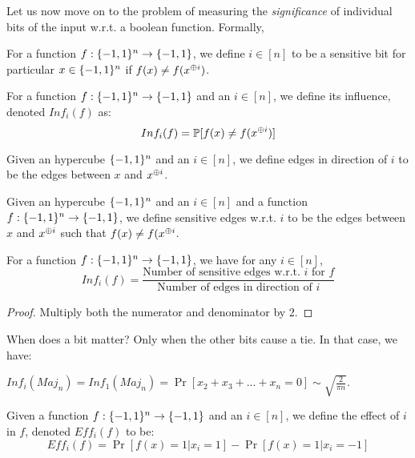 Let us now move on to the problem of measuring the \emph{significance} of individual bits of the input w.r.t. a boolean function. Formally,

\begin{definition}
    For a function ${f} : {\{-1,1\}^n} \rightarrow {\{-1,1\}}$, we define $i \in [n]$ to be a sensitive bit for particular $x \in \{-1,1\}^n$ if $f(x) \neq f(x^{\oplus i})$.
\end{definition}

\begin{definition}[Influence]
    For a function ${f} : {\{-1,1\}^n} \rightarrow {\{-1,1\}}$ and an $i \in [n]$, we define its influence, denoted $Inf_i(f)$ as:
    \[Inf_i(f) = \mathbb{P}[f(x) \neq f(x^{\oplus i})]\]
\end{definition}

\begin{definition}
    Given an hypercube $\{-1,1\}^n$ and an $i \in [n]$, we define edges in direction of $i$ to be the edges between $x$ and $x^{\oplus i}$.
\end{definition}

\begin{definition}
    Given an hypercube $\{-1,1\}^n$ and an $i \in [n]$ and a function ${f} : {\{-1,1\}^n} \rightarrow {\{-1,1\}}$, we define sensitive edges w.r.t. $i$ to be the edges between $x$ and $x^{\oplus i}$ such that $f(x) \neq f(x^{\oplus i}$.
\end{definition}

\begin{lemma}
    For a function ${f} : {\{-1,1\}^n} \rightarrow {\{-1,1\}}$, we have for any $i \in [n]$,
    \[Inf_i(f) = \frac{\text{Number of sensitive edges w.r.t. $i$ for $f$}}{\text{Number of edges in direction of $i$}}\]

    \begin{proof}
        Multiply both the numerator and denominator by 2.
    \end{proof}
\end{lemma}

\begin{question}

    When does a bit matter? Only when the other bits cause a tie. In that case, we have:
    
    $Inf_i(Maj_n) = Inf_1(Maj_n) = \Pr[x_2+x_3+...+x_n = 0] \sim \sqrt{\frac{2}{\pi n}}$.
\end{question}

\begin{definition}[Effect of $i$ in $f$]
    Given a function ${f} : {\{-1,1\}^n} \rightarrow {\{-1,1\}}$ and an $i \in [n]$, we define the effect of $i$ in $f$, denoted $Eff_i(f)$ to be:
    \[Eff_i(f) = \Pr[f(x) = 1| x_i = 1] - \Pr[f(x) = 1|x_i = -1]\]
\end{definition}

